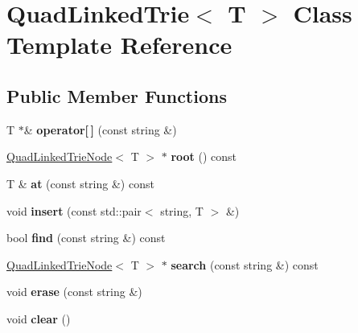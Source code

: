 \hypertarget{classQuadLinkedTrie}{\section{Quad\-Linked\-Trie$<$ T $>$ Class Template Reference}
\label{classQuadLinkedTrie}
}
\subsection*{Public Member Functions}
\begin{DoxyCompactItemize}
\item 
\hypertarget{classQuadLinkedTrie_a1915e494399b8145e26493158a780b79}{T $\ast$\& {\bfseries operator\mbox{[}$\,$\mbox{]}} (const string \&)}\label{classQuadLinkedTrie_a1915e494399b8145e26493158a780b79}

\item 
\hypertarget{classQuadLinkedTrie_ac82d2a90e41fd5f03a17ca6fa00cc400}{\hyperlink{classQuadLinkedTrieNode}{Quad\-Linked\-Trie\-Node}$<$ T $>$ $\ast$ {\bfseries root} () const }\label{classQuadLinkedTrie_ac82d2a90e41fd5f03a17ca6fa00cc400}

\item 
\hypertarget{classQuadLinkedTrie_a6f1e8d59c9449bbf317daa9358d8b33c}{T \& {\bfseries at} (const string \&) const }\label{classQuadLinkedTrie_a6f1e8d59c9449bbf317daa9358d8b33c}

\item 
\hypertarget{classQuadLinkedTrie_a3cc7a820596223f1c0918c48b4159341}{void {\bfseries insert} (const std\-::pair$<$ string, T $>$ \&)}\label{classQuadLinkedTrie_a3cc7a820596223f1c0918c48b4159341}

\item 
\hypertarget{classQuadLinkedTrie_a1a69d65cc01cd6a615d43b459f6f82e2}{bool {\bfseries find} (const string \&) const }\label{classQuadLinkedTrie_a1a69d65cc01cd6a615d43b459f6f82e2}

\item 
\hypertarget{classQuadLinkedTrie_a855d29897f7e09524a380ce273fb6866}{\hyperlink{classQuadLinkedTrieNode}{Quad\-Linked\-Trie\-Node}$<$ T $>$ $\ast$ {\bfseries search} (const string \&) const }\label{classQuadLinkedTrie_a855d29897f7e09524a380ce273fb6866}

\item 
\hypertarget{classQuadLinkedTrie_a3b96debc15395cc93b8e7a8f052c6388}{void {\bfseries erase} (const string \&)}\label{classQuadLinkedTrie_a3b96debc15395cc93b8e7a8f052c6388}

\item 
\hypertarget{classQuadLinkedTrie_a05128579d00351cf07d411a360fcb2e6}{void {\bfseries clear} ()}\label{classQuadLinkedTrie_a05128579d00351cf07d411a360fcb2e6}

\end{DoxyCompactItemize}


